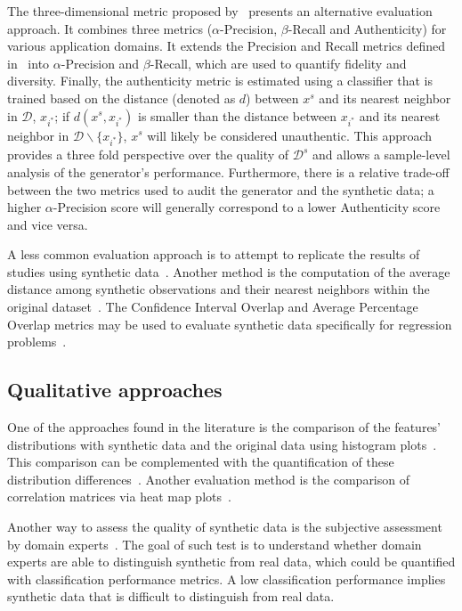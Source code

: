 \documentclass[parskip=full]{scrartcl}
\begin{document}
The three-dimensional metric proposed by~\citet{alaa2022faithful} presents an
alternative evaluation approach. It combines three metrics
($\alpha$-Precision, $\beta$-Recall and Authenticity) for various application
domains. It extends the Precision and Recall metrics defined
in~\cite{sajjadi2018assessing} into $\alpha$-Precision and $\beta$-Recall,
which are used to quantify fidelity and diversity. Finally, the authenticity
metric is estimated using a classifier that is trained based on the distance
(denoted as $d$) between $x^s$ and its nearest neighbor in $\mathcal{D}$,
$x_{i^*}$; if $d(x^s, x_{i^*})$ is smaller than the distance between $x_{i^*}$
and its nearest neighbor in $\mathcal{D}\backslash \{x_{i^*}\}$, $x^s$ will
likely be considered unauthentic. This approach provides a three fold
perspective over the quality of $\mathcal{D}^s$ and allows a sample-level
analysis of the generator's performance. Furthermore, there is a relative
trade-off between the two metrics used to audit the generator and the
synthetic data; a higher $\alpha$-Precision score will generally correspond to
a lower Authenticity score and vice versa.

A less common evaluation approach is to attempt to replicate the results of
studies using synthetic data~\cite{el2020seven, benaim2020analyzing,
rosenblatt2022epistemic}. Another method is the computation of the
average distance among synthetic observations and their nearest neighbors
within the original dataset~\cite{hittmeir2019utility}. The Confidence
Interval Overlap and Average Percentage Overlap metrics may be used to
evaluate synthetic data specifically for regression
problems~\cite{khan2022utility, karr2006framework}.

\subsection{Qualitative approaches}

One of the approaches found in the literature is the comparison of the
features' distributions with synthetic data and the original data using
histogram plots~\cite{hittmeir2019utility}. This comparison can be
complemented with the quantification of these distribution
differences~\cite{el2020seven}. Another evaluation method is the comparison of
correlation matrices via heat map plots~\cite{hittmeir2019utility}.

Another way to assess the quality of synthetic data is the subjective
assessment by domain experts~\cite{el2020seven}. The goal of such test is to
understand whether domain experts are able to distinguish synthetic from real
data, which could be quantified with classification performance metrics. A low
classification performance implies synthetic data that is difficult to
distinguish from real data.
\end{document}
